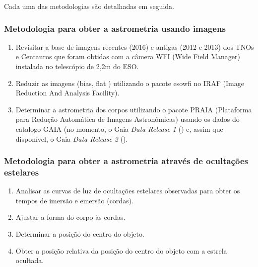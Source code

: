 \documentclass[a4paper, 11pt]{article}
\begin{document}
\noindent Cada uma das metodologias são detalhadas em seguida.
\subsubsection{Metodologia para obter a astrometria usando imagens}
\begin{enumerate}
  \item Revisitar a base de imagens recentes (2016) e antigas (2012 e 2013) dos TNOs e Centauros que foram obtidas com a câmera WFI (Wide Field Manager) instalada no telescópio de 2,2m do ESO.
  \item Reduzir as imagens (bias, flat ) utilizando o pacote esowfi no IRAF (Image Reduction And Analysis Facility). 
  \item Determinar a astrometria dos corpos utilizando o pacote PRAIA (Plataforma para Redução Automática de Imagens Astronômicas) usando os dados do catalogo GAIA (no momento, o Gaia {\it Data Release 1} (\citet{2016A&A...595A...4L}) e, assim que disponível, o Gaia {\it Data Release 2} (\citet{2017arXiv171010816K}).
\end{enumerate}
% 
% 

\subsubsection{Metodologia para obter a astrometria através de ocultações estelares}
\begin{enumerate}
  \item Analisar as curvas de luz de ocultações estelares observadas para obter os tempos de imersão e emersão (cordas).
  \item Ajustar a forma do corpo às cordas.
  \item Determinar a posição do centro do objeto.
  \item Obter a posição relativa da posição do centro do objeto com a estrela ocultada.
\end{enumerate}
\end{document}
